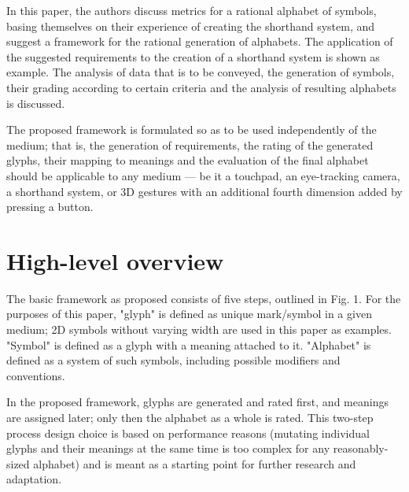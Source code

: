 \documentclass{vgtc}                          %
\begin{document}
In this paper, the authors discuss metrics for a rational alphabet of symbols, basing themselves on their experience of creating the shorthand system, and suggest a framework for the rational generation of alphabets. The application of the suggested requirements to the creation of a shorthand system is shown as example. The analysis of data that is to be conveyed, the generation of symbols, their grading according to certain criteria and the analysis of resulting alphabets is discussed.

The proposed framework is formulated so as to be used independently of the medium; that is, the generation of requirements, the rating of the generated glyphs, their mapping to meanings and the evaluation of the final alphabet should be applicable to any medium --- be it a touchpad, an eye-tracking camera, a shorthand system, or 3D gestures with an additional fourth dimension added by pressing a button.

\section{High-level overview}

The basic framework as proposed consists of five steps, outlined in Fig. 1. For the purposes of this paper, "glyph" is defined as unique mark/symbol in a given medium; 2D symbols without varying width are used in this paper as examples. "Symbol" is defined as a glyph with a meaning attached to it. "Alphabet" is defined as a system of such symbols, including possible modifiers and conventions.

In the proposed framework, glyphs are generated and rated first, and meanings are assigned later; only then the alphabet as a whole is rated. This two-step process design choice is based on performance reasons (mutating individual glyphs and their meanings at the same time is too complex for any reasonably-sized alphabet) and is meant as a starting point for further research and adaptation. 
\end{document}
